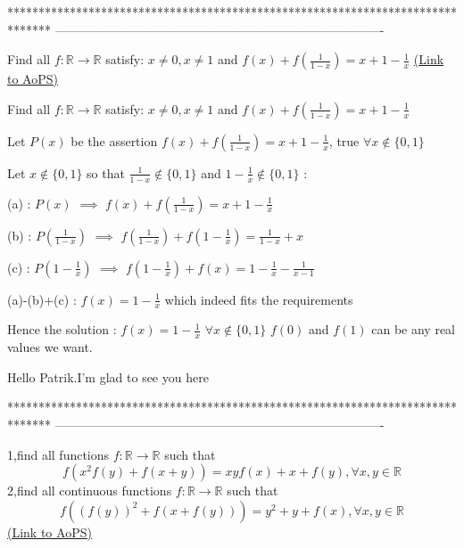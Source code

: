 *******************************************************************************
-------------------------------------------------------------------------------

\begin{problem}
	Find all $f:\mathbb{R}\rightarrow\mathbb{R}$ satisfy:
 $x\ne{0},x\ne{1}$ and $f(x)+f(\frac{1}{1-x})=x+1-\frac{1}{x}$
	\flushright \href{https://artofproblemsolving.com/community/c6h516363}{(Link to AoPS)}
\end{problem}



\begin{solution}
	\begin{tcolorbox}Find all $f:\mathbb{R}\rightarrow\mathbb{R}$ satisfy:
 $x\ne{0},x\ne{1}$ and $f(x)+f(\frac{1}{1-x})=x+1-\frac{1}{x}$\end{tcolorbox}
Let $P(x)$ be the assertion $f(x)+f(\frac 1{1-x})=x+1-\frac 1x$, true $\forall x\notin\{0,1\}$

Let $x\notin\{0,1\}$ so that $\frac 1{1-x}\notin\{0,1\}$ and $1-\frac 1x\notin\{0,1\}$ :

(a) : $P(x)$ $\implies$ $f(x)+f(\frac 1{1-x})=x+1-\frac 1x$

(b) : $P(\frac 1{1-x})$ $\implies$ $f(\frac 1{1-x})+f(1-\frac 1x)=\frac 1{1-x}+x$

(c) : $P(1-\frac 1x)$ $\implies$ $f(1-\frac 1x)+f(x)=1-\frac 1x-\frac 1{x-1}$

(a)-(b)+(c) : $f(x)=1-\frac 1x$ which indeed fits the requirements

Hence the solution :
$f(x)=1-\frac 1x$ $\forall x\notin\{0,1\}$
$f(0)$ and $f(1)$ can be any real values we want.
\end{solution}



\begin{solution}
	Hello Patrik.I'm glad to see you here 
\end{solution}
*******************************************************************************
-------------------------------------------------------------------------------

\begin{problem}
	1,find all functions $f:\mathbb{R}\to\mathbb{R}$ such that \[f(x^2 f(y)+f(x+y))=xyf(x)+x+f(y),\forall x,y\in\mathbb{R}\]
2,find all continuous  functions $f:\mathbb{R}\to\mathbb{R}$ such that \[f(( f(y))^2+f(x+f(y)))=y^2+y+f(x),\forall x,y\in\mathbb{R}\]
	\flushright \href{https://artofproblemsolving.com/community/c6h525743}{(Link to AoPS)}
\end{problem}



